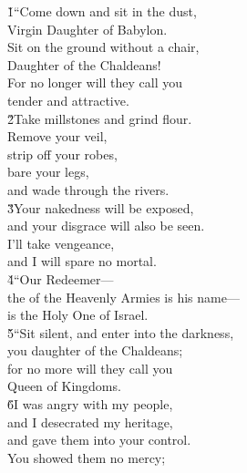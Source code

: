 \begin{poetry}
\poeml {}
\v{1}``Come down and sit in the dust, \\
\poemll    Virgin Daughter of Babylon. \\
\poeml Sit on the ground without a chair, \\
\poemll    Daughter of the Chaldeans! \\
\poeml For no longer will they call you \\
\poemll    tender and attractive. \\
\poeml \v{2}Take millstones and grind flour. \\
\poemll    Remove your veil, \\
\poeml strip off your robes, \\
\poemll    bare your legs, \\
\poemlll       and wade through the rivers. \\
\poeml \v{3}Your nakedness will be exposed, \\
\poemll    and your disgrace will also be seen. \\
\poeml I'll take vengeance, \\
\poemll    and I will spare no mortal. \\
\poeml \v{4}``Our Redeemer--- \\
\poemll    the  of the Heavenly Armies is his name--- \\
\poemlll       is the Holy One of Israel. \\
\poeml \v{5}``Sit silent, and enter into the darkness, \\
\poemll    you daughter of the Chaldeans; \\
\poeml for no more will they call you \\
\poemll    Queen of Kingdoms. \\
\poeml \v{6}I was angry with my people, \\
\poemll    and I desecrated my heritage, \\
\poeml and gave them into your control. \\
\poemll    You showed them no mercy; \\

\end{poetry}
